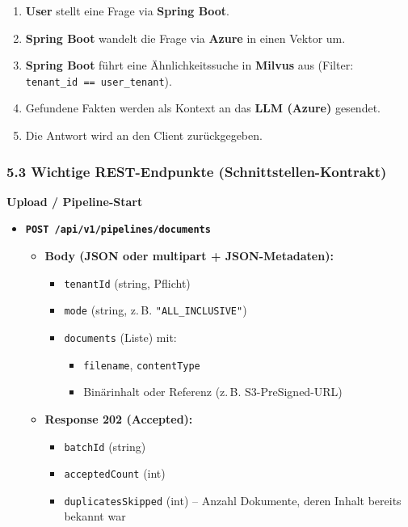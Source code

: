 \begin{enumerate}
\def\labelenumi{\arabic{enumi}.}
\tightlist
\item
  \textbf{User} stellt eine Frage via \textbf{Spring Boot}.
\item
  \textbf{Spring Boot} wandelt die Frage via \textbf{Azure} in einen
  Vektor um.
\item
  \textbf{Spring Boot} führt eine Ähnlichkeitssuche in \textbf{Milvus}
  aus (Filter: \texttt{tenant\_id\ ==\ user\_tenant}).
\item
  Gefundene Fakten werden als Kontext an das \textbf{LLM (Azure)}
  gesendet.
\item
  Die Antwort wird an den Client zurückgegeben.
\end{enumerate}

\subsubsection{5.3 Wichtige REST-Endpunkte
(Schnittstellen-Kontrakt)}\label{wichtige-rest-endpunkte-schnittstellen-kontrakt}

\textbf{Upload / Pipeline-Start}

\begin{itemize}
\tightlist
\item
  \textbf{\texttt{POST\ /api/v1/pipelines/documents}}

  \begin{itemize}
  \tightlist
  \item
    \textbf{Body (JSON oder multipart + JSON-Metadaten):}

    \begin{itemize}
    \tightlist
    \item
      \texttt{tenantId} (string, Pflicht)
    \item
      \texttt{mode} (string, z.\,B. \texttt{"ALL\_INCLUSIVE"})
    \item
      \texttt{documents} (Liste) mit:

      \begin{itemize}
      \tightlist
      \item
        \texttt{filename}, \texttt{contentType}
      \item
        Binärinhalt oder Referenz (z.\,B. S3-PreSigned-URL)
      \end{itemize}
    \end{itemize}
  \item
    \textbf{Response 202 (Accepted):}

    \begin{itemize}
    \tightlist
    \item
      \texttt{batchId} (string)
    \item
      \texttt{acceptedCount} (int)
    \item
      \texttt{duplicatesSkipped} (int) -- Anzahl Dokumente, deren Inhalt
      bereits bekannt war
    \end{itemize}
  \end{itemize}
\end{itemize}

